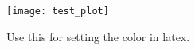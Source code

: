\documentclass{article}
\begin{document}
\begin{figure}
	\centering
	\texttt{[image: test\_plot]}
	
	\caption{\label{fig:test} Use this for setting the color in latex.}
\end{figure}
\end{document}
